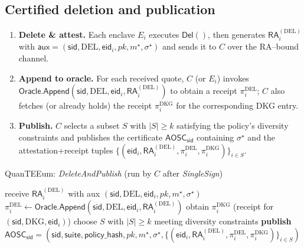 \documentclass[runningheads,orivec]{llncs}
\newcommand{\prot}{\textsf{QuanTEEum}}
\newcommand{\sid}{\mathsf{sid}}
\begin{document}
\subsection{Certified deletion and publication}
\begin{enumerate}[leftmargin=*,itemsep=0.25em]
  \item \textbf{Delete \& attest.} Each enclave $E_i$ executes $\textsf{Del}()$, then generates
        $\mathsf{RA}^{(\mathrm{DEL})}_i$ with $\mathsf{aux}=(\sid,\mathrm{DEL},\mathsf{eid}_i,pk,m^{\star},\sigma^{\star})$
        and sends it to $C$ over the RA–bound channel.
  \item \textbf{Append to oracle.} For each received quote, $C$ (or $E_i$) invokes
        $\textsf{Oracle.Append}(\sid,\mathrm{DEL},\mathsf{eid}_i,\mathsf{RA}^{(\mathrm{DEL})}_i)$
        to obtain a receipt $\pi_i^{\mathrm{DEL}}$;
        $C$ also fetches (or already holds) the receipt $\pi_i^{\mathrm{DKG}}$ for the corresponding DKG entry.
  \item \textbf{Publish.} $C$ selects a subset $S$ with $|S|\ge k$ satisfying the policy’s diversity constraints and publishes
        the certificate $\mathsf{AOSC}_\sid$ containing $\sigma^{\star}$ and the attestation+receipt tuples $\{(\mathsf{eid}_i,\mathsf{RA}^{(\mathrm{DEL})}_i,\pi_i^{\mathrm{DEL}},\pi_i^{\mathrm{DKG}})\}_{i\in S}$.
\end{enumerate}

\begin{algorithm}[!htbp]
\caption{\prot{}: \emph{DeleteAndPublish} (run by $C$ after \emph{SingleSign})}
\label{alg:delete-publish}
\begin{small}
\begin{algorithmic}[1]
  \State receive $\mathsf{RA}^{(\mathrm{DEL})}_i$ with aux $(\sid,\mathrm{DEL},\mathsf{eid}_i,pk,m^{\star},\sigma^{\star})$
  \State $\pi_i^{\mathrm{DEL}} \gets \textsf{Oracle.Append}(\sid,\mathrm{DEL},\mathsf{eid}_i,\mathsf{RA}^{(\mathrm{DEL})}_i)$
  \State obtain $\pi_i^{\mathrm{DKG}}$ (receipt for $(\sid,\mathrm{DKG},\mathsf{eid}_i)$)
\EndFor
\State choose $S$ with $|S|\ge k$ meeting diversity constraints
\State \textbf{publish} $\mathsf{AOSC}_\sid = (\sid,\mathsf{suite},\mathsf{policy\_hash},pk,m^{\star},\sigma^{\star},\{(\mathsf{eid}_i,\mathsf{RA}^{(\mathrm{DEL})}_i,\pi_i^{\mathrm{DEL}},\pi_i^{\mathrm{DKG}})\}_{i\in S})$
\end{algorithmic}
\end{small}
\end{algorithm}
\end{document}
